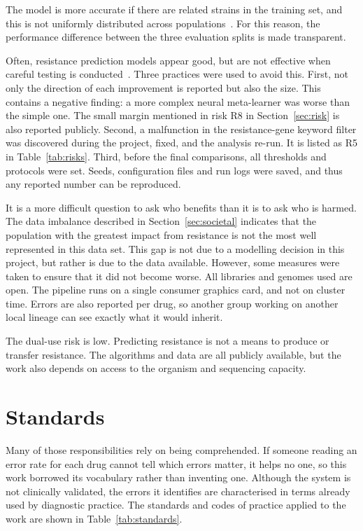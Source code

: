 The model is more accurate if there are related strains in the training set, and this is not
uniformly distributed across populations~\cite{Yu2025}. For this reason, the performance
difference between the three evaluation splits is made transparent.

Often, resistance prediction models appear good, but are not effective when careful testing is
conducted~\cite{Hu2024}. Three practices were used to avoid this. First, not only the direction
of each improvement is reported but also the size. This contains a negative finding: a more
complex neural meta-learner was worse than the simple one. The small margin mentioned in risk
R8 in Section~\ref{sec:risk} is also reported publicly. Second, a malfunction in the
resistance-gene keyword filter was discovered during the project, fixed, and the analysis
re-run. It is listed as R5 in Table~\ref{tab:risks}. Third, before the final comparisons, all
thresholds and protocols were set. Seeds, configuration files and run logs were saved, and thus
any reported number can be reproduced.

It is a more difficult question to ask who benefits than it is to ask who is harmed. The data
imbalance described in Section~\ref{sec:societal} indicates that the population with the
greatest impact from resistance is not the most well represented in this data set. This gap is
not due to a modelling decision in this project, but rather is due to the data available.
However, some measures were taken to ensure that it did not become worse. All libraries and
genomes used are open. The pipeline runs on a single consumer graphics card, and not on cluster
time. Errors are also reported per drug, so another group working on another local lineage can
see exactly what it would inherit.

The dual-use risk is low. Predicting resistance is not a means to produce or transfer
resistance. The algorithms and data are all publicly available, but the work also depends on
access to the organism and sequencing capacity.

\section{Standards}
\label{sec:standards}

Many of those responsibilities rely on being comprehended. If someone reading an error rate for
each drug cannot tell which errors matter, it helps no one, so this work borrowed its
vocabulary rather than inventing one. Although the system is not clinically validated, the
errors it identifies are characterised in terms already used by diagnostic practice. The
standards and codes of practice applied to the work are shown in Table~\ref{tab:standards}.

